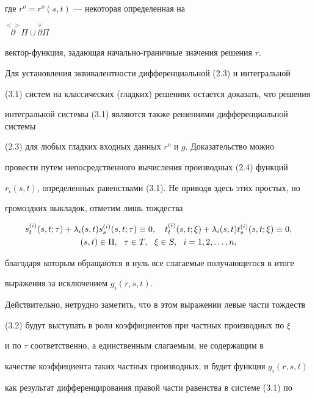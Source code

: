 где $r^o=r^o(s,t)$ --- некоторая определенная на 


$\overset{<>}{\partial}{}{\Pi} \cup \overset{\vee}{\partial}{}{\Pi}$ 


вектор-функция, задающая начально-граничные значения решения $r$.





Для установления эквивалентности дифференциальной (2.3) и интегральной


(3.1) систем на классических (гладких) решениях остается доказать, что решения


интегральной системы (3.1) являются также решениями дифференциальной системы 


(2.3) для любых гладких входных данных $r^o$ и $g$. Доказательство можно 


провести путем непосредственного вычисления производных (2.4) функций 


$r_i (s,t)$, определенных равенствами (3.1). Не приводя здесь этих простых, но 


громоздких выкладок, отметим лишь тождества


\begin{gather}


s_t^{(i)} (s,t;\tau)+ \lambda_i (s,t) s_s^{(i)} (s,t; \tau) \equiv 0,\quad


t_t^{(i)} (s,t;\xi)+\lambda_i (s,t) t_s^{(i)} (s,t; \xi) \equiv 0, \\


%


(s,t) \in {\Pi},\ \ \tau \in T,\ \ \xi \in S,\ \ i=1,2,\dotsc,n,\notag


\end{gather}


благодаря которым обращаются в нуль все слагаемые получающегося в итоге 


выражения за исключением $g_i (r,s,t)$.





Действительно, нетрудно заметить, что в этом выражении левые части тождеств 


(3.2) будут выступать в роли коэффициентов при частных производных по $\xi$


и по $\tau$ соответственно, а единственным слагаемым, не содержащим в 


качестве коэффициента таких частных производных, и будет функция $g_i (r,s,t)$


как результат дифференцирования правой части равенства в системе (3.1) по 


